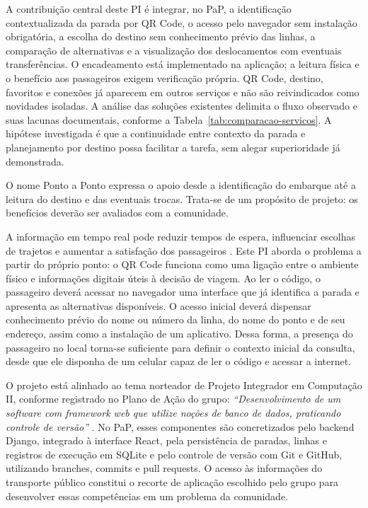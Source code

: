 \documentclass[12pt,oneside,a4paper,brazil,chapter=TITLE]{abntex2}
\begin{document}
A contribuição central deste PI é integrar, no PaP, a identificação contextualizada da parada por QR Code, o acesso pelo navegador sem instalação obrigatória, a escolha do destino sem conhecimento prévio das linhas, a comparação de alternativas e a visualização dos deslocamentos com eventuais transferências. O encadeamento está implementado na aplicação; a leitura física e o benefício aos passageiros exigem verificação própria. QR Code, destino, favoritos e conexões já aparecem em outros serviços e não são reivindicados como novidades isoladas. A análise das soluções existentes delimita o fluxo observado e suas lacunas documentais, conforme a Tabela~\ref{tab:comparacao-servicos}. A hipótese investigada é que a continuidade entre contexto da parada e planejamento por destino possa facilitar a tarefa, sem alegar superioridade já demonstrada.

O nome Ponto a Ponto expressa o apoio desde a identificação do embarque até a leitura do destino e das eventuais trocas. Trata-se de um propósito de projeto: os benefícios deverão ser avaliados com a comunidade.

A informação em tempo real pode reduzir tempos de espera, influenciar escolhas de trajetos e aumentar a satisfação dos passageiros \citep{brakewood2019}. Este PI aborda o problema a partir do próprio ponto: o QR Code funciona como uma ligação entre o ambiente físico e informações digitais úteis à decisão de viagem. Ao ler o código, o passageiro deverá acessar no navegador uma interface que já identifica a parada e apresenta as alternativas disponíveis. O acesso inicial deverá dispensar conhecimento prévio do nome ou número da linha, do nome do ponto e de seu endereço, assim como a instalação de um aplicativo. Dessa forma, a presença do passageiro no local torna-se suficiente para definir o contexto inicial da consulta, desde que ele disponha de um celular capaz de ler o código e acessar a internet.

O projeto está alinhado ao tema norteador de Projeto Integrador em Computação II, conforme registrado no Plano de Ação do grupo: \textit{``Desenvolvimento de um software com framework web que utilize noções de banco de dados, praticando controle de versão''} \citep[p.~1]{planoacao2026}. No PaP, esses componentes são concretizados pelo backend Django, integrado à interface React, pela persistência de paradas, linhas e registros de execução em SQLite e pelo controle de versão com Git e GitHub, utilizando branches, commits e pull requests. O acesso às informações do transporte público constitui o recorte de aplicação escolhido pelo grupo para desenvolver essas competências em um problema da comunidade.
\end{document}
